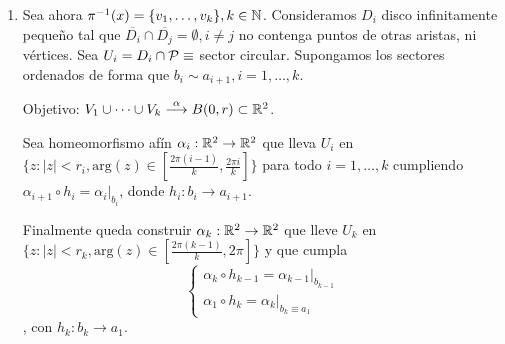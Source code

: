 {\begin{enumerate}
        Existen homeomorfismos $\alpha_i : \R^2 \to \R^2$ (de hecho aplicaciones afines) tales que: 
        \[\alpha_1(U_1) = \{z\in \mathbb{C} : |z| < r_1, \text{Im}(z) \ge 0\} = \{(x,y)\in\R^2 : \|(x,y)\| < r_1, y \ge 0\}\]
        \[\alpha_2(U_2) = \{z\in \mathbb{C} : |z| < r_2, \text{Im}(z) \le 0\}\]
        y también que $\alpha_2 \circ h = \alpha_1|_a$.
        
        Sea $r = \min\{r_1, r_2\}$ y llamo $V_1 = \alpha^{-1}(\{z : |z|<r, \text{Im}(z) \ge 0\})$ y $V_2 = \alpha^{-1}(\{z : |z|<r, \text{Im}(z) \le 0\})$. Lo que hemos llamado $A = V_1 \cup V_2$ abierto de $\partes$. $\alpha : V_1 \cup V_2 \to B(0,r)$ identificación (continua, cerrada, sobreyectiva) donde $\alpha(x) = \begin{cases}
            \alpha_1(x) & x \in V_1 \\
            \alpha_2(x) & x \in V_2
        \end{cases}$. Está bien definida y pasa al cociente porque $xRy, x\in a, y \in a' \implies y = h(x)$ y entonces $\alpha(y) = \alpha_2(y) = \alpha_2(h(x)) = \alpha_1(x) = \alpha(x)$. %
        \item Sea ahora $\pi^{-1}(x) = \{v_1, \dots, v_k\}, k \in \mathbb{N}$. Consideramos $D_i$ disco infinitamente pequeño tal que $\overline{D_i} \cap \overline{D_j} = \emptyset, i \neq j$ no contenga puntos de otras aristas, ni vértices. 
        Sea $U_i = D_i \cap \mathcal{P} \equiv$ sector circular. Supongamos los sectores ordenados de forma que $b_i \sim a_{i+1}, i=1,\dots,k$.

        Objetivo: $V_1 \cup \dots \cup V_k \overset{\alpha}{\longrightarrow} B(0,r) \subset \mathbb{R}^2$. 

        Sea homeomorfismo afín $\alpha_i : \R^2 \to \R^2$ que lleva $U_i$ en $\{z : |z| < r_i, \text{arg}(z) \in [\frac{2\pi(i-1)}{k}, \frac{2\pi i}{k}]\}$ para todo $i=1,\dots,k$ cumpliendo $\alpha_{i+1} \circ h_i = \alpha_i|_{b_i}$, donde $h_i : b_i \to a_{i+1}$.
        
        Finalmente queda construir $\alpha_k : \mathbb{R}^2 \to \mathbb{R}^2$ que lleve $U_k$ en $\{z : |z| < r_k, \text{arg}(z) \in [\frac{2\pi(k-1)}{k}, 2\pi]\}$ y que cumpla 
        \begin{equation}
            \label{5.3-casos} \begin{cases}
                \alpha_k \circ h_{k-1} = \alpha_{k-1}|_{b_{k-1}} \\
                \alpha_1 \circ h_k = \alpha_k|_{b_k \equiv a_1}
            \end{cases}
        \end{equation}, con $h_k : b_k \to a_1$.
        

\end{enumerate}}
